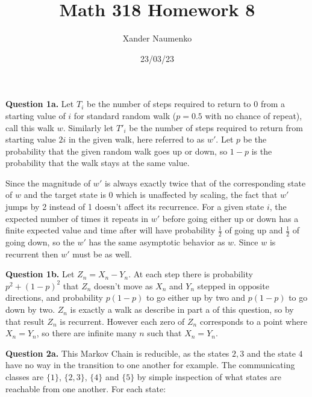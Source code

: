 \documentclass[letterpaper, reqno,11pt]{article}
\begin{document}
\title{Math 318 Homework 8}
\date{23/03/23}
\author{Xander Naumenko}
\maketitle

{\medskip\noindent\bf Question 1a.} Let $T_i$ be the number of steps required to return to $0$ from a starting value of $i$ for standard random walk ($p=0.5$ with no chance of repeat), call this walk $w$. Similarly let $T'_i$ be the number of steps required to return from starting value $2i$ in the given walk, here referred to as $w'$. Let $p$ be the probability that the given random walk goes up or down, so $1-p$ is the probability that the walk stays at the same value. 

Since the magnitude of $w'$ is always exactly twice that of the corresponding state of $w$ and the target state is 0 which is unaffected by scaling, the fact that $w'$ jumps by 2 instead of 1 doesn't affect its recurrence. For a given state $i$, the expected number of times it repeats in $w'$ before going either up or down has a finite expected value and time after will have probability $\frac{1}{2}$ of going up and $\frac{1}{2}$ of going down, so the $w'$ has the same asymptotic behavior as $w$. Since $w$ is recurrent then $w'$ must be as well.


{\medskip\noindent\bf Question 1b.} Let $Z_n=X_n-Y_n$. At each step there is probability $p^2+(1-p)^2$ that $Z_n$ doesn't move as $X_n$ and $Y_n$ stepped in opposite directions, and probability $p(1-p)$ to go either up by two and $p(1-p)$ to go down by two. $Z_n$ is exactly a walk as describe in part a of this question, so by that result $Z_n$ is recurrent. However each zero of $Z_n$ corresponds to a point where $X_n=Y_n$, so there are infinite many $n$ such that $X_n=Y_n$.

{\medskip\noindent\bf Question 2a.} This Markov Chain is reducible, as the states $2, 3$ and the state $4$ have no way in the transition to one another for example. The communicating classes are $\{1\} $, $\{2,3\} $, $\{4\} $ and $\{5\} $ by simple inspection of what states are reachable from one another. For each state: 
\end{document}
